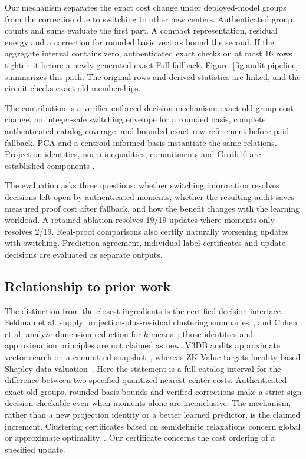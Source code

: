 Our mechanism separates the exact cost change under deployed-model groups
from the correction due to switching to other new centers. Authenticated
group counts and sums evaluate the first part. A compact representation,
residual energy and a correction for rounded basis vectors bound the second.
If the aggregate interval contains zero, authenticated exact checks on at
most 16 rows tighten it before a newly generated exact Full fallback.
Figure~\ref{fig:audit-pipeline} summarizes this path. The original rows and
derived statistics are linked, and the circuit checks exact old memberships.

The contribution is a verifier-enforced decision mechanism: exact old-group
cost change, an integer-safe switching envelope for a rounded basis,
complete authenticated catalog coverage, and bounded exact-row refinement
before paid fallback. PCA and a centroid-informed basis instantiate the same
relations. Projection identities, norm inequalities, commitments and
Groth16 are established components
\cite{feldman2013tiny,feldman2020tiny,cohen2015dimensionality,groth2016,poseidon22023}.

The evaluation asks three questions: whether switching information resolves
decisions left open by authenticated moments, whether the resulting audit
saves measured proof cost after fallback, and how the benefit changes with
the learning workload. A retained ablation resolves 19/19 updates where
moments-only resolves 2/19. Real-proof comparisons also certify naturally
worsening updates with switching. Prediction agreement, individual-label
certificates and update decisions are evaluated as separate outputs.



\subsection{Relationship to prior work}
The distinction from the closest ingredients is the certified decision
interface. Feldman et al. supply projection-plus-residual clustering
summaries~\cite{feldman2013tiny,feldman2020tiny}, and Cohen et al. analyze
dimension reduction for $k$-means~\cite{cohen2015dimensionality}; those
identities and approximation principles are not claimed as new. V3DB audits
approximate vector search on a committed snapshot~\cite{v3db2026}, whereas
ZK-Value targets locality-based Shapley data valuation~\cite{wang2026zkvalue}.
Here the statement is a full-catalog interval for the difference between two
specified quantized nearest-center costs. Authenticated exact old groups,
rounded-basis bounds and verified corrections make a strict sign decision
checkable even when moments alone are inconclusive. The mechanism, rather
than a new projection identity or a better learned predictor, is the claimed
increment.
Clustering certificates based on semidefinite relaxations concern global or
approximate optimality~\cite{iguchi2016certifiably,mixon2017certificates}.
Our certificate concerns the cost ordering of a specified update.

